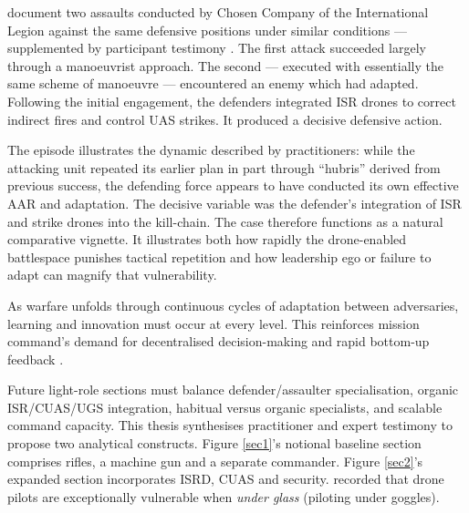 
\textcite{Chosen_10_24_5_24,Chosen_8_2024_8_13} document two assaults conducted by Chosen Company of the International Legion against the same defensive positions under similar conditions --- supplemented by participant testimony \textcite{dan_participant_1,darragh_participant_4,fred_participant_9,Dave_2024_3_22,hallatt_2024_03_13_1}. The first attack succeeded largely through a manoeuvrist approach. The second --- executed with essentially the same scheme of manoeuvre --- encountered an enemy which had adapted. Following the initial engagement, the defenders integrated ISR drones to correct indirect fires and control UAS strikes. It produced a decisive defensive action. 

The episode illustrates the dynamic described by practitioners: while the attacking unit repeated its earlier plan in part through ``hubris'' \parencite{darragh_participant_4} derived from previous success, the defending force appears to have conducted its own effective AAR and adaptation. The decisive variable was the defender's integration of ISR and strike drones into the kill-chain. The case therefore functions as a natural comparative vignette. It illustrates both how rapidly the drone-enabled battlespace punishes tactical repetition and how leadership ego or failure to adapt can magnify that vulnerability.

As warfare unfolds through continuous cycles of adaptation between adversaries, learning and innovation must occur at every level. This reinforces mission command's demand for decentralised decision-making and rapid bottom-up feedback \parencite{ryan_2022_08_24_adaptation_battle_russia}.






Future light-role sections must balance defender/assaulter specialisation, organic ISR/CUAS/UGS integration, habitual versus organic specialists, and scalable command capacity. This thesis synthesises practitioner and expert testimony \parencite{dan_participant_1,darragh_participant_4,fred_participant_9,stu_lyle_participant_11,Watling_book} to propose two analytical constructs. Figure \ref{sec1}'s notional baseline section comprises rifles, a machine gun and a separate commander. Figure \ref{sec2}'s expanded section incorporates ISRD, CUAS and security. \textcite{dan_participant_1} recorded that drone pilots are exceptionally vulnerable when \textit{under glass} (piloting under goggles).

